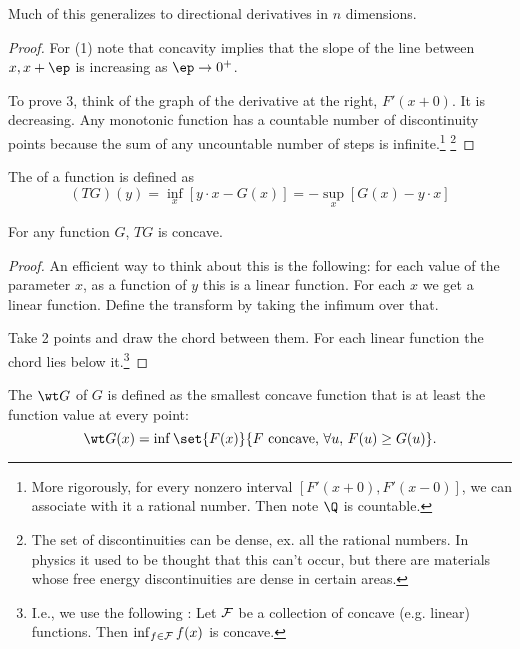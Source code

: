 Much of this generalizes to directional derivatives in $n$ dimensions.
\begin{proof}
For (1) note that concavity implies that the slope of the line between $x,x+\ep$ is increasing as $\ep\to 0^+$.


To prove 3, think of the graph of the derivative at the right, $F'(x+0)$. It is decreasing. Any monotonic function has a countable number of discontinuity points because the sum of any uncountable number of steps is infinite.\footnote{More rigorously, for every nonzero interval $[F'(x+0),F'(x-0)]$, we can associate with it a rational number. Then note $\Q$ is countable. }
\footnote{The set of discontinuities can be dense, ex. all the rational numbers. In physics it used to be thought that this can't occur, but there are materials whose free energy discontinuities are dense in certain areas.}

\end{proof}

\begin{df}
The  of a function is defined as
\[
(TG)(y) = \inf_x [y\cdot x - G(x)] = - \sup_x [G(x) - y\cdot x]
\]
\end{df}
\begin{thm}
For any function $G$, $TG$ is concave.
\end{thm}
\begin{proof}
An efficient way to think about this is the following: for each value of the parameter $x$, as a function of $y$ this is a linear function. For each $x$ we get a linear function. Define the transform by taking the infimum over that. 

Take 2 points and draw the chord between them. For each linear function the chord lies below it.\footnote{I.e., we use the following : Let $\cal F$ be a collection of concave (e.g. linear) functions. Then $\inf_{f\in \cal F}f(x)$ is concave.} 

\end{proof}
\begin{df}
The  $\wt G$ of $G$ is defined as the smallest concave function that is at least the function value at every point:
\[
\wt G(x)=\inf \set{F(x)}{F\text{ concave, }\forall u, \,F(u)\ge G(u)}.
\]
\end{df}

